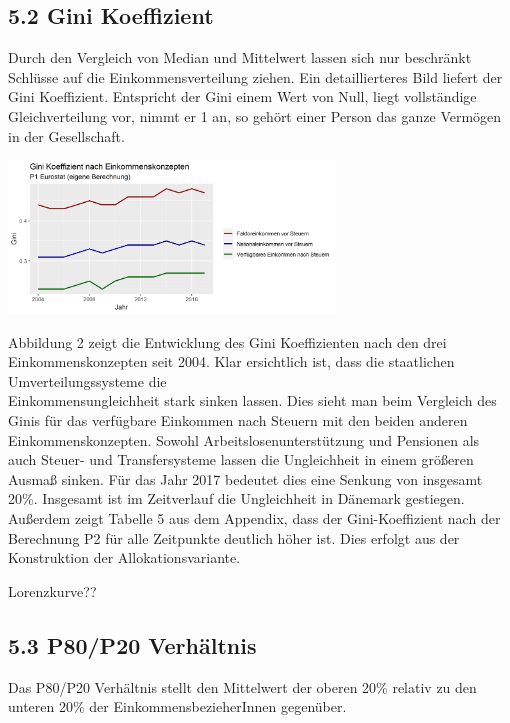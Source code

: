 \documentclass[12pt,]{article}
\let\origfigure\figure
\let\endorigfigure\endfigure
\renewenvironment{figure}[1][2] {
        \expandafter\origfigure\expandafter[H]
      } {\endorigfigure}
\begin{document}
\subsection{5.2 Gini Koeffizient}\label{gini-koeffizient}

Durch den Vergleich von Median und Mittelwert lassen sich nur beschränkt
Schlüsse auf die Einkommensverteilung ziehen. Ein detaillierteres Bild
liefert der Gini Koeffizient. Entspricht der Gini einem Wert von Null,
liegt vollständige Gleichverteilung vor, nimmt er 1 an, so gehört einer
Person das ganze Vermögen in der Gesellschaft.

\begin{figure}
\centering
\includegraphics[width=0.65000\textwidth]{img/gini.png}
\caption{Gini-Index, 2004-2017}
\end{figure}

Abbildung 2 zeigt die Entwicklung des Gini Koeffizienten nach den drei
Einkommenskonzepten seit 2004. Klar ersichtlich ist, dass die
staatlichen Umverteilungssysteme die\\
Einkommensungleichheit stark sinken lassen. Dies sieht man beim
Vergleich des Ginis für das verfügbare Einkommen nach Steuern mit den
beiden anderen Einkommenskonzepten. Sowohl Arbeitslosenunterstützung und
Pensionen als auch Steuer- und Transfersysteme lassen die Ungleichheit
in einem größeren Ausmaß sinken. Für das Jahr 2017 bedeutet dies eine
Senkung von insgesamt 20\%. Insgesamt ist im Zeitverlauf die
Ungleichheit in Dänemark gestiegen. Außerdem zeigt Tabelle 5 aus dem
Appendix, dass der Gini-Koeffizient nach der Berechnung P2 für alle
Zeitpunkte deutlich höher ist. Dies erfolgt aus der Konstruktion der
Allokationsvariante.

Lorenzkurve??

\subsection{5.3 P80/P20 Verhältnis}\label{p80p20-verhaltnis}

Das P80/P20 Verhältnis stellt den Mittelwert der oberen 20\% relativ zu
den unteren 20\% der EinkommensbezieherInnen gegenüber.
\end{document}
